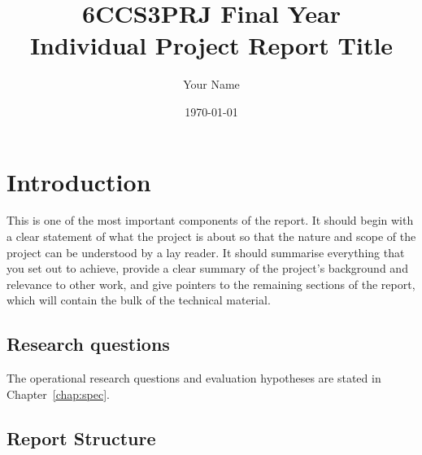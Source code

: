 \documentclass[11pt]{informatics-report}
\title{6CCS3PRJ Final Year\\\vspace{0.2cm}Individual Project Report Title}
\author{Your Name}
\date{\today}
\begin{document}
\createFrontMatter
\onehalfspacing
\tableofcontents
\doublespacing


\chapter{Introduction}
\label{chap:intro}

This is one of the most important components of the report. It should begin with a clear statement of what the project is about so that the nature and scope of the project can be understood by a lay reader. It should summarise everything that you set out to achieve, provide a clear summary of the project's background and relevance to other work, and give pointers to the remaining sections of the report, which will contain the bulk of the technical material.

\section{Research questions}
\label{sec:intro-rqs}

The operational research questions and evaluation hypotheses are
stated in Chapter~\ref{chap:spec}.

\section{Report Structure}













\appendix


 
\end{document}
